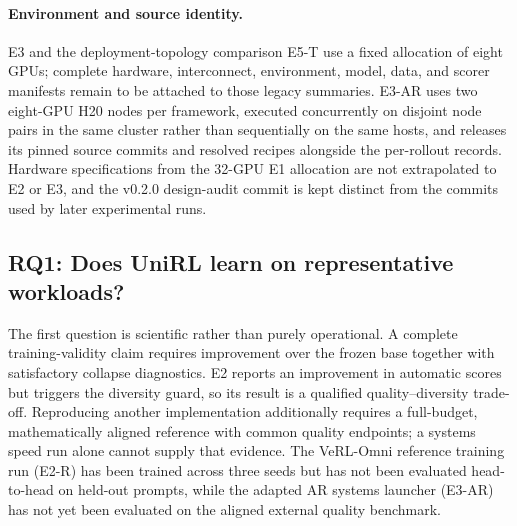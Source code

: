\documentclass[10pt]{article}
\begin{document}
\paragraph{Environment and source identity.}
E3 and the deployment-topology comparison E5-T use a fixed allocation of eight GPUs; complete hardware, interconnect, environment, model, data, and scorer manifests remain to be attached to those legacy summaries.
E3-AR uses two eight-GPU H20 nodes per framework, executed concurrently on disjoint node pairs in the same cluster rather than sequentially on the same hosts, and releases its pinned source commits and resolved recipes alongside the per-rollout records.
Hardware specifications from the 32-GPU E1 allocation are not extrapolated to E2 or E3, and the v0.2.0 design-audit commit is kept distinct from the commits used by later experimental runs.

\subsection{RQ1: Does UniRL learn on representative workloads?}
\label{sec:rq1}

The first question is scientific rather than purely operational.
A complete training-validity claim requires improvement over the frozen base together with satisfactory collapse diagnostics.
E2 reports an improvement in automatic scores but triggers the diversity guard, so its result is a qualified quality--diversity trade-off.
Reproducing another implementation additionally requires a full-budget, mathematically aligned reference with common quality endpoints; a systems speed run alone cannot supply that evidence.
The VeRL-Omni reference training run (E2-R) has been trained across three seeds but has not been evaluated head-to-head on held-out prompts, while the adapted AR systems launcher (E3-AR) has not yet been evaluated on the aligned external quality benchmark.
\end{document}
